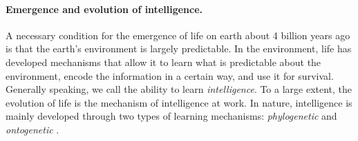 \documentclass[../../book-main.tex]{subfiles}
\begin{document}
\paragraph{Emergence and evolution of intelligence.}

A necessary condition for the emergence of life on earth about 4 billion years ago is that the earth's environment is largely predictable. In the environment, life has developed mechanisms that allow it to learn what is predictable about the environment, encode the information in a certain way, and use it for survival. Generally speaking, we call the ability to learn {\em intelligence}. To a large extent, the evolution of life is the mechanism of intelligence at work. In nature, intelligence is mainly developed through two types of learning mechanisms: {\em phylogenetic} and {\em ontogenetic} \cite{Wiener-Cybernetics-1961}.%
\end{document}
